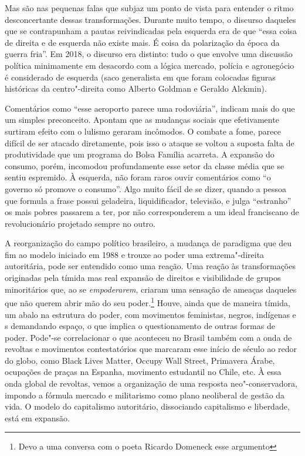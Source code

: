 Mas são nas pequenas falas que subjaz um ponto de vista para entender o
ritmo desconcertante dessas transformações. Durante muito tempo, o
discurso daqueles que se contrapunham a pautas reivindicadas pela
esquerda era de que ``essa coisa de direita e de esquerda não existe
mais. É coisa da polarização da época da guerra fria''. Em 2018, o
discurso era distinto: tudo o que envolve uma discussão política
minimamente em desacordo com a lógica mercado, polícia e agronegócio é
considerado de esquerda (saco generalista em que foram colocadas figuras
históricas da centro"-direita como Alberto Goldman e Geraldo Alckmin).

Comentários como ``esse aeroporto parece uma rodoviária'', indicam mais
do que um simples preconceito. Apontam que as mudanças sociais que
efetivamente surtiram efeito com o lulismo geraram incômodos. O combate
a fome, parece difícil de ser atacado diretamente, pois isso o ataque se
voltou a suposta falta de produtividade que um programa do Bolsa Família
acarreta. A expansão do consumo, porém, incomodou profundamente esse
setor da classe média que se sentiu espremido. À esquerda, não foram
raros ouvir comentários como ``o governo só promove o consumo''. Algo
muito fácil de se dizer, quando a pessoa que formula a frase possui
geladeira, liquidificador, televisão, e julga ``estranho'' os mais
pobres passarem a ter, por não corresponderem a um ideal franciscano de
revolucionário projetado sempre no outro.

A reorganização do campo político brasileiro, a mudança de paradigma que
deu fim ao modelo iniciado em 1988 e trouxe ao poder uma extrema"-direita
autoritária, pode ser entendido como uma reação. Uma reação às
transformações originadas pela tímida mas real expansão de direitos e
visibilidade de grupos minoritários que, ao se \emph{empoderarem},
criaram uma sensação de ameaças daqueles que não querem abrir mão do seu
poder.\footnote{Devo a uma conversa com o poeta Ricardo
  Domeneck esse argumento} Houve, ainda que de maneira tímida, um
abalo na estrutura do poder, com movimentos feministas, negros,
indígenas e s demandando espaço, o que implica o questionamento de
outras formas de poder. Pode"-se correlacionar o que aconteceu no Brasil
também com a onda de revoltas e movimentos contestatórios que marcaram
esse início de século  ao redor do globo, como Black Lives Matter,
Occupy Wall Street, Primavera Árabe, ocupações de praças na Espanha,
movimento estudantil no Chile, etc. À essa onda global de revoltas,
vemos a organização de uma resposta neo"-conservadora, impondo a fórmula
mercado e militarismo como plano neoliberal de gestão da vida. O modelo
do capitalismo autoritário, dissociando capitalismo e liberdade, está em
expansão.

